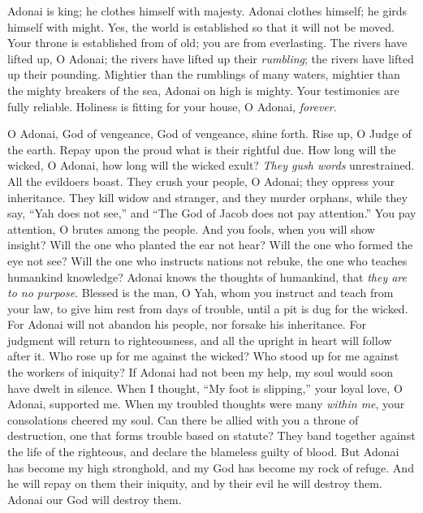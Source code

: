 \begin{biblechapter} %
 Adonai is king; he clothes himself with majesty. 
Adonai clothes himself; he girds himself with might. 
Yes, the world is established so that it will not be moved.
\verse Your throne is established from of old; 
you are from everlasting.
\verse The rivers have lifted up, O Adonai; 
the rivers have lifted up their \textit{rumbling}; 
the rivers have lifted up their pounding.
\verse Mightier than the rumblings of many waters, 
mightier than the mighty breakers of the sea, 
Adonai on high is mighty.
\verse Your testimonies are fully reliable. 
Holiness is fitting for your house, 
O Adonai, \textit{forever}.
\end{biblechapter}

\begin{biblechapter} %
 O Adonai, God of vengeance, 
God of vengeance, shine forth.
\verse Rise up, O Judge of the earth. 
Repay upon the proud what is their rightful due.
\verse How long will the wicked, O Adonai, 
how long will the wicked exult?
\verse \textit{They gush words} unrestrained. 
All the evildoers boast.
\verse They crush your people, O Adonai; 
they oppress your inheritance.
\verse They kill widow and stranger, 
and they murder orphans,
\verse while they say, “Yah does not see,” 
and “The God of Jacob does not pay attention.”
\verse You pay attention, O brutes among the people. 
And you fools, when you will show insight?
\verse Will the one who planted the ear not hear? 
Will the one who formed the eye not see?
\verse Will the one who instructs nations not rebuke, 
the one who teaches humankind knowledge?
\verse Adonai knows the thoughts of humankind, 
that \textit{they are to no purpose}.
\verse Blessed is the man, O Yah, whom you instruct 
and teach from your law,
\verse to give him rest from days of trouble, 
until a pit is dug for the wicked.
\verse For Adonai will not abandon his people, 
nor forsake his inheritance.
\verse For judgment will return to righteousness, 
and all the upright in heart will follow after it.
\verse Who rose up for me against the wicked? 
Who stood up for me against the workers of iniquity?
\verse If Adonai had not been my help, 
my soul would soon have dwelt in silence.
\verse When I thought, “My foot is slipping,” 
your loyal love, O Adonai, supported me.
\verse When my troubled thoughts were many \textit{within me}, 
your consolations cheered my soul.
\verse Can there be allied with you a throne of destruction, 
one that forms trouble based on statute?
\verse They band together against the life of the righteous, 
and declare the blameless guilty of blood.
\verse But Adonai has become my high stronghold, 
and my God has become my rock of refuge.
\verse And he will repay on them their iniquity, 
and by their evil he will destroy them. 
Adonai our God will destroy them.
\end{biblechapter}

